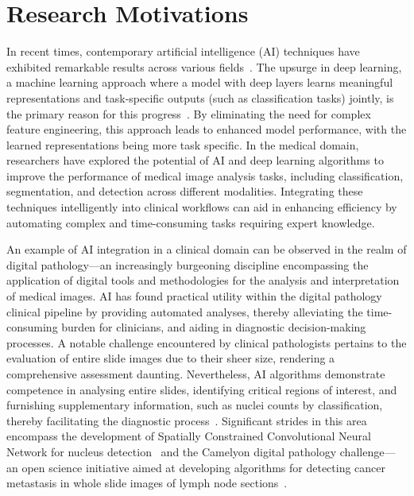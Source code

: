 \section{Research Motivations}
\label{sec:motivation}
In recent times, contemporary artificial intelligence (AI) techniques have exhibited remarkable results across various fields~\citep{sarker2021deep}. The upsurge in deep learning, a machine learning approach where a model with deep layers learns meaningful representations and task-specific outputs (such as classification tasks) jointly, is the primary reason for this progress~\citep{lecun2015deep}. By eliminating the need for complex feature engineering, this approach leads to enhanced model performance, with the learned representations being more task specific. In the medical domain, researchers have explored the potential of AI and deep learning algorithms to improve the performance of medical image analysis tasks, including classification, segmentation, and detection across different modalities. Integrating these techniques intelligently into clinical workflows can aid in enhancing efficiency by automating complex and time-consuming tasks requiring expert knowledge. 

An example of AI integration in a clinical domain can be observed in the realm of digital pathology—an increasingly burgeoning discipline encompassing the application of digital tools and methodologies for the analysis and interpretation of medical images. AI has found practical utility within the digital pathology clinical pipeline by providing automated analyses, thereby alleviating the time-consuming burden for clinicians, and aiding in diagnostic decision-making processes. A notable challenge encountered by clinical pathologists pertains to the evaluation of entire slide images due to their sheer size, rendering a comprehensive assessment daunting. Nevertheless, AI algorithms demonstrate competence in analysing entire slides, identifying critical regions of interest, and furnishing supplementary information, such as nuclei counts by classification, thereby facilitating the diagnostic process~\citep{dimitriou2019deep}. Significant strides in this area encompass the development of Spatially Constrained Convolutional Neural Network for nucleus detection~\citep{sirinukunwattana2016locality} and the Camelyon digital pathology challenge—an open science initiative aimed at developing algorithms for detecting cancer metastasis in whole slide images of lymph node sections~\citep{bejnordi2017diagnostic}.

